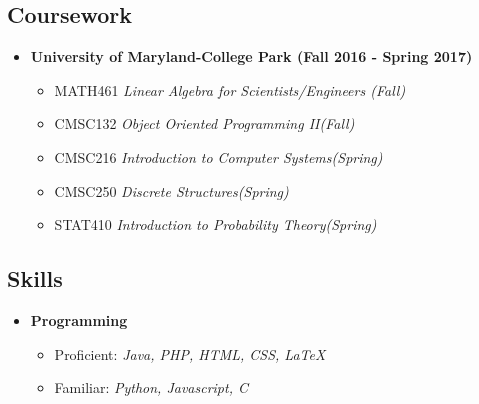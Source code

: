\documentclass[11pt,letterpaper]{moderncv}
\begin{document}
\vspace{-12pt}
\subsection{Coursework}
\begin{itemize}
	\item[]{\textbf{University of Maryland-College Park (Fall 2016 - Spring 2017)}}
		\vspace{-8pt}
		\begin{itemize}
			\item[]{{MATH461} \hfill \textit{Linear Algebra for Scientists/Engineers (Fall)}}
			\vspace{-4pt}
			\item[]{{CMSC132} \hfill \textit{Object Oriented Programming II(Fall)}}
			\vspace{-4pt}
			\item[]{CMSC216} \hfill \textit{Introduction to Computer Systems(Spring)}
			\vspace{-4pt}
			\item[]{CMSC250} \hfill \textit{Discrete Structures(Spring)}
			\vspace{-4pt}
			\item[]{{STAT410} \hfill \textit{Introduction to Probability Theory(Spring)}}
			\vspace{0pt}
		\end{itemize}
\end{itemize}
\vspace{-12pt}
\subsection{Skills}


\begin{itemize}

\item[]{\textbf{Programming}}

	\vspace{-8pt}
	\begin{itemize}
		\vspace{-2pt}
		\item[] Proficient: \hfill \textit{Java, PHP, HTML, CSS, \LaTeX}
		\vspace{-4pt}
		\item[] Familiar: \hfill \textit{Python, Javascript, C}
		\vspace{0pt}
	\end{itemize}

\end{itemize}
\vspace{-12pt}
\end{document}
